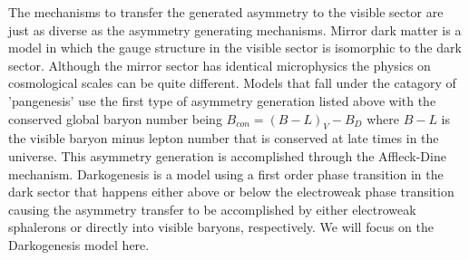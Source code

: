 The mechanisms to transfer the generated asymmetry to the visible sector are just as diverse as the asymmetry generating mechanisms. Mirror dark matter is a model in 
which the gauge structure in the visible sector is isomorphic to the dark sector. Although the mirror sector has identical microphysics the physics on cosmological 
scales can be quite different. Models that fall under the catagory of 'pangenesis' use the first type of asymmetry generation listed above with the conserved global 
baryon number being $B_{con} = (B-L)_V-B_D$ where $B-L$ is the visible baryon minus lepton number that is conserved at late times in the universe. This asymmetry 
generation is accomplished through the Affleck-Dine mechanism. Darkogenesis is a model using a first order phase transition in the dark sector that happens either 
above or below the electroweak phase transition causing the asymmetry transfer to be accomplished by either electroweak sphalerons or directly into visible baryons, 
respectively. We will focus on the Darkogenesis model here.







